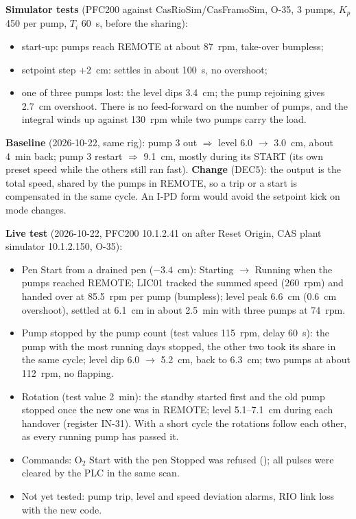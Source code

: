 \documentclass[11pt,a4paper]{article}
\begin{document}
\textbf{Simulator tests} (PFC200 against CasRioSim/CasFramoSim, O-35, 3 pumps, $K_p$ 450 per pump, $T_i$ 60~s, before the sharing):
\begin{itemize}[nosep]
  \item start-up: pumps reach REMOTE at about 87~rpm, take-over bumpless;
  \item setpoint step +2~cm: settles in about 100~s, no overshoot;
  \item one of three pumps lost: the level dips 3.4~cm; the pump rejoining gives 2.7~cm overshoot. There
        is no feed-forward on the number of pumps, and the integral winds up against 130~rpm while two
        pumps carry the load.
\end{itemize}
\textbf{Baseline} (2026-10-22, same rig): pump 3 out $\Rightarrow$ level 6.0 $\to$ 3.0~cm, about 4~min back;
pump 3 restart $\Rightarrow$ 9.1~cm, mostly during its START (its own preset speed while the others still
ran fast). \textbf{Change} (DEC5): the output is the total speed, shared by the pumps in REMOTE, so a
trip or a start is compensated in the same cycle. An I-PD form would avoid the setpoint kick on mode
changes.

\textbf{Live test} (2026-10-22, PFC200 10.1.2.41 on  after Reset Origin, CAS plant simulator
10.1.2.150, O-35):
\begin{itemize}[nosep]
  \item Pen Start from a drained pen ($-3.4$~cm): Starting $\to$ Running when the pumps reached REMOTE;
        LIC01 tracked the summed speed (260~rpm) and handed over at 85.5~rpm per pump (bumpless); level
        peak 6.6~cm (0.6~cm overshoot), settled at 6.1~cm in about 2.5~min with three pumps at 74~rpm.
  \item Pump stopped by the pump count (test values  115~rpm, delay 60~s): the pump
        with the most running days stopped, the other two took its share in the same cycle; level dip
        6.0 $\to$ 5.2~cm, back to 6.3~cm; two pumps at about 112~rpm, no flapping.
  \item Rotation (test value  2~min): the standby started first and the old pump
        stopped once the new one was in REMOTE; level 5.1--7.1~cm during each handover (register
        IN-31). With a short cycle the rotations follow each other, as every running pump has passed it.
  \item Commands: O$_2$ Start with the pen Stopped was refused (); all pulses were
        cleared by the PLC in the same scan.
  \item Not yet tested: pump trip, level and speed deviation alarms, RIO link loss with the new code.
\end{itemize}
\end{document}
